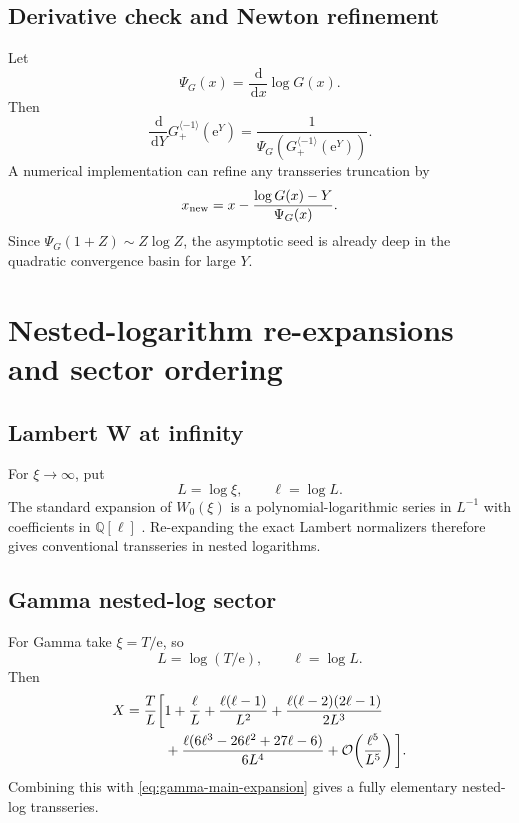 \documentclass[11pt,a4paper]{article}
\numberwithin{equation}{section}
\theoremstyle{definition}
\theoremstyle{remark}
\newcommand{\e}{\mathrm e}
\newcommand{\dd}{\,\mathrm d}
\newcommand{\Ord}{\mathcal O}
\newcommand{\cinv}{\langle-1\rangle}
\newcommand{\BarnesInv}{G_{+}^{\cinv}}
\begin{document}
\subsection{Derivative check and Newton refinement}

Let
\begin{equation}
 \Psi_G(x)=\frac{\dd}{\dd x}\log G(x).
 \label{eq:barnes-digamma}
\end{equation}
Then
\begin{equation}
 \frac{\dd}{\dd Y}\BarnesInv(\e^Y)
 =\frac1{\Psi_G(\BarnesInv(\e^Y))}.
 \label{eq:barnes-inverse-derivative}
\end{equation}
A numerical implementation can refine any transseries truncation by
\begin{equation}
 x_{\rm new}=x-\frac{\log G(x)-Y}{\Psi_G(x)}.
 \label{eq:barnes-Newton}
\end{equation}
Since \(\Psi_G(1+Z)\sim Z\log Z\), the asymptotic seed is already deep in
the quadratic convergence basin for large \(Y\).

\section{Nested-logarithm re-expansions and sector ordering}

\subsection{Lambert W at infinity}

For \(\xi\to\infty\), put
\begin{equation}
 L=\log\xi,
 \qquad \ell=\log L.
 \label{eq:Lell}
\end{equation}
The standard expansion of \(W_0(\xi)\) is a polynomial-logarithmic series
in \(L^{-1}\) with coefficients in \(\mathbb Q[\ell]\)
\cite{Corless1996,DLMFLambert}.  Re-expanding the exact Lambert normalizers
therefore gives conventional transseries in nested logarithms.

\subsection{Gamma nested-log sector}

For Gamma take \(\xi=T/\e\), so
\begin{equation}
 L=\log(T/\e),\qquad \ell=\log L.
 \label{eq:gamma-Lell}
\end{equation}
Then
\begin{align}
 X=\frac{T}{L}\bigg[{}&1+\frac{\ell}{L}
 +\frac{\ell(\ell-1)}{L^2}
 +\frac{\ell(\ell-2)(2\ell-1)}{2L^3}
 \notag\\
 &+\frac{\ell(6\ell^3-26\ell^2+27\ell-6)}{6L^4}
 +\Ord\!\left(\frac{\ell^5}{L^5}\right)\bigg].
 \label{eq:gamma-X-nested}
\end{align}
Combining this with \cref{eq:gamma-main-expansion} gives a fully elementary
nested-log transseries.
\end{document}
